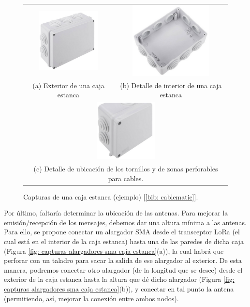 \documentclass[12pt]{article}
\begin{document}
	
	\begin{figure}[h!]
		\begin{center}
			\begin{tabular}{cc}
				\includegraphics[width=32mm]{img/caja_estanca_1.png} &   \includegraphics[width=42mm]{img/caja_estanca_2.png} \\
				(a) Exterior de una caja estanca & (b) Detalle de interior de una caja estanca  \\[6pt]
				\multicolumn{2}{c}{\includegraphics[width=32mm]{img/caja_estanca_3.png} }\\
				\multicolumn{2}{c}{(c) Detalle de ubicación de los tornillos y de zonas perforables para cables. }
			\end{tabular}
			\caption{Capturas de una caja estanca (ejemplo) [\ref{bib: cablematic}]. }
			\label{fig: capturas caja estanca}
		\end{center}
	\end{figure}
	
	\pagebreak
	
	\noindent Por último, faltaría determinar la ubicación de las antenas. Para mejorar la emisión/recepción de los mensajes, debemos dar una altura mínima a las antenas. Para ello, se propone conectar un alargador SMA desde el transceptor LoRa (el cual está en el interior de la caja estanca) hasta una de las paredes de dicha caja (Figura \ref{fig: capturas alargadores sma caja estanca}(a)), la cual habrá que perforar con un taladro para sacar la salida de ese alargador al exterior. De esta manera, podremos conectar otro alargador (de la longitud que se desee) desde el exterior de la caja estanca hasta la altura que dé dicho alargador (Figura \ref{fig: capturas alargadores sma caja estanca}(b)), y conectar en tal punto la antena (permitiendo, así, mejorar la conexión entre ambos nodos).\\
	
\end{document}
